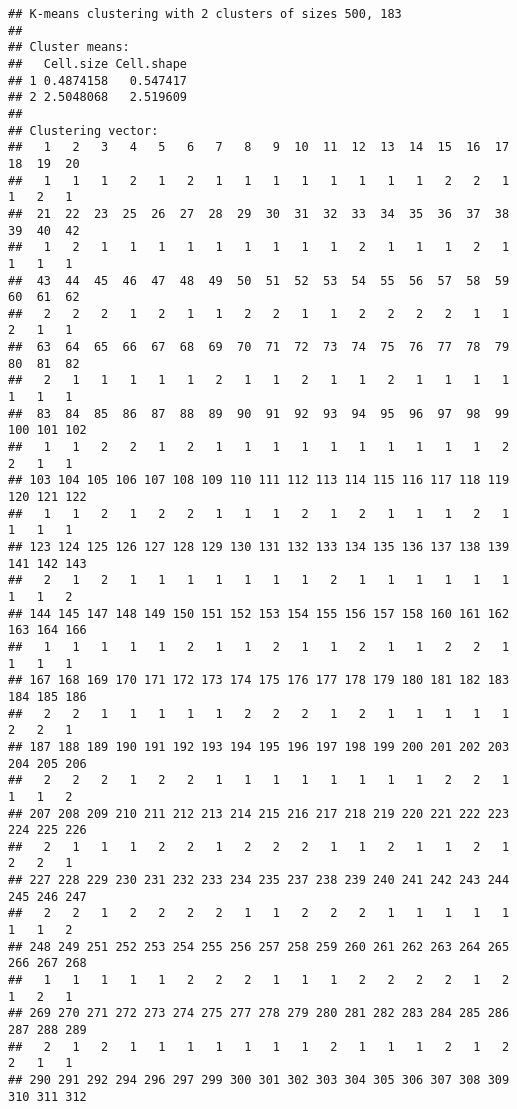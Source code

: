 \documentclass[]{article}
\begin{document}
\begin{verbatim}
## K-means clustering with 2 clusters of sizes 500, 183
## 
## Cluster means:
##   Cell.size Cell.shape
## 1 0.4874158   0.547417
## 2 2.5048068   2.519609
## 
## Clustering vector:
##   1   2   3   4   5   6   7   8   9  10  11  12  13  14  15  16  17  18  19  20 
##   1   1   1   2   1   2   1   1   1   1   1   1   1   1   2   2   1   1   2   1 
##  21  22  23  25  26  27  28  29  30  31  32  33  34  35  36  37  38  39  40  42 
##   1   2   1   1   1   1   1   1   1   1   1   2   1   1   1   2   1   1   1   1 
##  43  44  45  46  47  48  49  50  51  52  53  54  55  56  57  58  59  60  61  62 
##   2   2   2   1   2   1   1   2   2   1   1   2   2   2   2   1   1   2   1   1 
##  63  64  65  66  67  68  69  70  71  72  73  74  75  76  77  78  79  80  81  82 
##   2   1   1   1   1   1   2   1   1   2   1   1   2   1   1   1   1   1   1   1 
##  83  84  85  86  87  88  89  90  91  92  93  94  95  96  97  98  99 100 101 102 
##   1   1   2   2   1   2   1   1   1   1   1   1   1   1   1   1   2   2   1   1 
## 103 104 105 106 107 108 109 110 111 112 113 114 115 116 117 118 119 120 121 122 
##   1   1   2   1   2   2   1   1   1   2   1   2   1   1   1   2   1   1   1   1 
## 123 124 125 126 127 128 129 130 131 132 133 134 135 136 137 138 139 141 142 143 
##   2   1   2   1   1   1   1   1   1   1   2   1   1   1   1   1   1   1   1   2 
## 144 145 147 148 149 150 151 152 153 154 155 156 157 158 160 161 162 163 164 166 
##   1   1   1   1   1   2   1   1   2   1   1   2   1   1   2   2   1   1   1   1 
## 167 168 169 170 171 172 173 174 175 176 177 178 179 180 181 182 183 184 185 186 
##   2   2   1   1   1   1   1   2   2   2   1   2   1   1   1   1   1   2   2   1 
## 187 188 189 190 191 192 193 194 195 196 197 198 199 200 201 202 203 204 205 206 
##   2   2   2   1   2   2   1   1   1   1   1   1   1   1   2   2   1   1   1   2 
## 207 208 209 210 211 212 213 214 215 216 217 218 219 220 221 222 223 224 225 226 
##   2   1   1   1   2   2   1   2   2   2   1   1   2   1   1   2   1   2   2   1 
## 227 228 229 230 231 232 233 234 235 237 238 239 240 241 242 243 244 245 246 247 
##   2   2   1   2   2   2   2   1   1   2   2   2   1   1   1   1   1   1   1   2 
## 248 249 251 252 253 254 255 256 257 258 259 260 261 262 263 264 265 266 267 268 
##   1   1   1   1   1   2   2   2   1   1   1   2   2   2   2   1   2   1   2   1 
## 269 270 271 272 273 274 275 277 278 279 280 281 282 283 284 285 286 287 288 289 
##   2   1   2   1   1   1   1   1   1   1   2   1   1   1   2   1   2   2   1   1 
## 290 291 292 294 296 297 299 300 301 302 303 304 305 306 307 308 309 310 311 312 

\end{verbatim}
\end{document}
